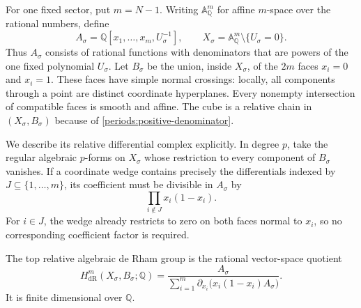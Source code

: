 For one fixed sector, put $m=N-1$.  Writing $\mathbb A^m_{\mathbb Q}$
for affine $m$-space over the rational numbers, define
\begin{equation}
 A_\sigma=\mathbb Q[x_1,\ldots,x_m,U_\sigma^{-1}],\qquad
 X_\sigma=\mathbb A^m_{\mathbb Q}\setminus\{U_\sigma=0\}.
 \label{periods:ring}
\end{equation}
Thus $A_\sigma$ consists of rational functions with denominators that are
powers of the one fixed polynomial $U_\sigma$.  Let $B_\sigma$ be the
union, inside $X_\sigma$, of the $2m$ faces $x_i=0$ and $x_i=1$.  These
faces have simple normal crossings: locally, all components through a
point are distinct coordinate hyperplanes.  Every nonempty intersection
of compatible faces is smooth and affine.  The cube is a relative chain
in $(X_\sigma,B_\sigma)$ because of
\eqref{periods:positive-denominator}.

We describe its relative differential complex explicitly.  In degree $p$,
take the regular algebraic $p$-forms on $X_\sigma$ whose restriction to
every component of $B_\sigma$ vanishes.  If a coordinate wedge contains
precisely the differentials indexed by $J\subseteq\{1,\ldots,m\}$, its
coefficient must be divisible in $A_\sigma$ by
\begin{equation}
 \prod_{i\notin J}x_i(1-x_i).
 \label{periods:boundary-factors}
\end{equation}
For $i\in J$, the wedge already restricts to zero on both faces normal
to $x_i$, so no corresponding coefficient factor is required.

\begin{lemma}
\label{periods:relative-presentation}
The top relative algebraic de Rham group is the rational vector-space
quotient
\begin{equation}
 \boxed{
 H_{\mathrm{dR}}^m(X_\sigma,B_\sigma;\mathbb Q)
 =\frac{A_\sigma}
 {\displaystyle\sum_{i=1}^m
 \partial_{x_i}\bigl(x_i(1-x_i)A_\sigma\bigr)}.}
 \label{periods:relative-quotient}
\end{equation}
It is finite dimensional over $\mathbb Q$.
\end{lemma}

